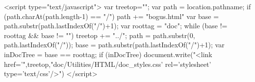 \documentclass[11pt]{article}
\begin{document}
\begin{rawhtml}
<script type="text/javascript">
var treetop="";
var path = location.pathname;
if (path.charAt(path.length-1) == "/") {
  path += "bogus.html"
}
var base = path.substr(path.lastIndexOf("/")+1);
var roottag = "doc";
while (base != roottag && base != "") {
  treetop += "../";
  path = path.substr(0, path.lastIndexOf("/"));
  base = path.substr(path.lastIndexOf("/")+1);
}
var inDocTree = base == roottag;
if (inDocTree) {
document.write("<link href='",treetop,"doc/Utilities/HTML/doc_styles.css' rel='stylesheet' type='text/css'/>")
}
</script>
\end{rawhtml}


\newpage
\tableofcontents
\newpage



\newpage




%

%



\newpage
%
\newpage
%

\newpage


\newpage
\printindex
\end{document}
